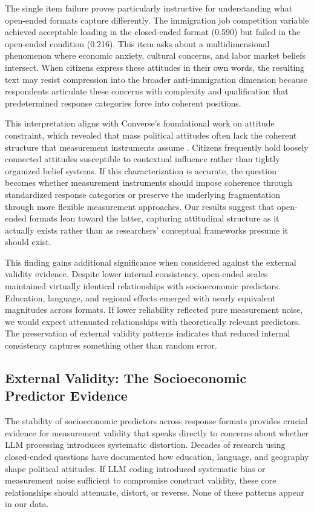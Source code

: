 \documentclass[
  journal=ram,
  manuscript=article-type,
  year=2025,
  volume=unpublished,
]{cup-journal}
\begin{document}
The single item failure proves particularly instructive for understanding what open-ended formats capture differently.
The immigration job competition variable achieved acceptable loading in the closed-ended format (0.590) but failed in the open-ended condition (0.216).
This item asks about a multidimensional phenomenon where economic anxiety, cultural concerns, and labor market beliefs intersect.
When citizens express these attitudes in their own words, the resulting text may resist compression into the broader anti-immigration dimension because respondents articulate these concerns with complexity and qualification that predetermined response categories force into coherent positions.

This interpretation aligns with Converse’s foundational work on attitude constraint, which revealed that mass political attitudes often lack the coherent structure that measurement instruments assume \citep{converse64}.
Citizens frequently hold loosely connected attitudes susceptible to contextual influence rather than tightly organized belief systems.
If this characterization is accurate, the question becomes whether measurement instruments should impose coherence through standardized response categories or preserve the underlying fragmentation through more flexible measurement approaches.
Our results suggest that open-ended formats lean toward the latter, capturing attitudinal structure as it actually exists rather than as researchers’ conceptual frameworks presume it should exist.

This finding gains additional significance when considered against the external validity evidence.
Despite lower internal consistency, open-ended scales maintained virtually identical relationships with socioeconomic predictors.
Education, language, and regional effects emerged with nearly equivalent magnitudes across formats.
If lower reliability reflected pure measurement noise, we would expect attenuated relationships with theoretically relevant predictors.
The preservation of external validity patterns indicates that reduced internal consistency captures something other than random error.

\subsection{External Validity: The Socioeconomic Predictor Evidence}

The stability of socioeconomic predictors across response formats provides crucial evidence for measurement validity that speaks directly to concerns about whether LLM processing introduces systematic distortion.
Decades of research using closed-ended questions have documented how education, language, and geography shape political attitudes.
If LLM coding introduced systematic bias or measurement noise sufficient to compromise construct validity, these core relationships should attenuate, distort, or reverse.
None of these patterns appear in our data.
\end{document}
